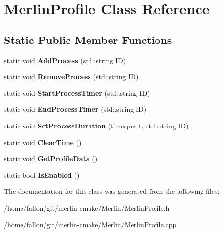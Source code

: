 \hypertarget{classMerlinProfile}{}\section{Merlin\+Profile Class Reference}
\label{classMerlinProfile}
\subsection*{Static Public Member Functions}
\begin{DoxyCompactItemize}
\item 
\mbox{\label{classMerlinProfile_a3eb1452ef8df91477dcd388eedf1eb79}} 
static void {\bfseries Add\+Process} (std\+::string ID)
\item 
\mbox{\label{classMerlinProfile_a77213a74b632933c9d5e9d8ad70d220d}} 
static void {\bfseries Remove\+Process} (std\+::string ID)
\item 
\mbox{\label{classMerlinProfile_a0b1df0105c0492d30df6e2710fd32749}} 
static void {\bfseries Start\+Process\+Timer} (std\+::string ID)
\item 
\mbox{\label{classMerlinProfile_abaaf5bcc177e694a692524ff1138cd5e}} 
static void {\bfseries End\+Process\+Timer} (std\+::string ID)
\item 
\mbox{\label{classMerlinProfile_a9a66f9c1599cc308bd35a6de1372b160}} 
static void {\bfseries Set\+Process\+Duration} (timespec t, std\+::string ID)
\item 
\mbox{\label{classMerlinProfile_a4a8f7fe7998b0c41de72c1557b2595d4}} 
static void {\bfseries Clear\+Time} ()
\item 
\mbox{\label{classMerlinProfile_acdedf65c95a05160b04503622b0f08eb}} 
static void {\bfseries Get\+Profile\+Data} ()
\item 
\mbox{\label{classMerlinProfile_ae73ff6bdcbefb2918d2de910036ca81e}} 
static bool {\bfseries Is\+Enabled} ()
\end{DoxyCompactItemize}


The documentation for this class was generated from the following files\+:\begin{DoxyCompactItemize}
\item 
/home/fallon/git/merlin-\/cmake/\+Merlin/Merlin\+Profile.\+h\item 
/home/fallon/git/merlin-\/cmake/\+Merlin/Merlin\+Profile.\+cpp\end{DoxyCompactItemize}
